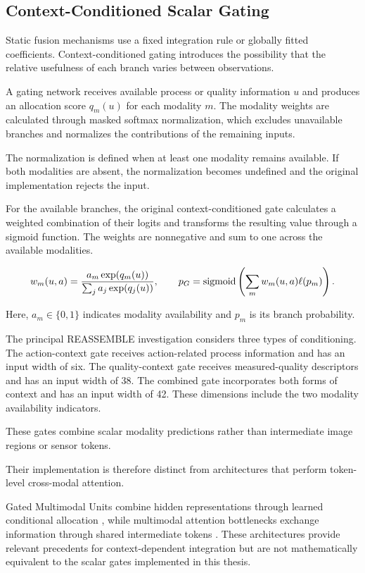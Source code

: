 \subsection{Context-Conditioned Scalar Gating}

Static fusion mechanisms use a fixed integration rule or globally fitted coefficients. Context-conditioned gating introduces the possibility that the relative usefulness of each branch varies between observations.

A gating network receives available process or quality information \(u\) and produces an allocation score \(q_m(u)\) for each modality \(m\). The modality weights are calculated through masked softmax normalization, which excludes unavailable branches and normalizes the contributions of the remaining inputs.

The normalization is defined when at least one modality remains available. If both modalities are absent, the normalization becomes undefined and the original implementation rejects the input.

For the available branches, the original context-conditioned gate calculates a weighted combination of their logits and transforms the resulting value through a sigmoid function. The weights are nonnegative and sum to one across the available modalities.

\begin{equation}
 w_m(u,a)=\frac{a_m\exp(q_m(u))}{\sum_j a_j\exp(q_j(u))},\qquad
 p_G=\operatorname{sigmoid}\left(\sum_m w_m(u,a)\ell(p_m)\right).
 \label{eq:gate}
\end{equation}

Here, \(a_m\in\{0,1\}\) indicates modality availability and \(p_m\) is its branch probability.

The principal REASSEMBLE investigation considers three types of conditioning. The action-context gate receives action-related process information and has an input width of six. The quality-context gate receives measured-quality descriptors and has an input width of 38. The combined gate incorporates both forms of context and has an input width of 42. These dimensions include the two modality availability indicators.

These gates combine scalar modality predictions rather than intermediate image regions or sensor tokens.

Their implementation is therefore distinct from architectures that perform token-level cross-modal attention.

Gated Multimodal Units combine hidden representations through learned conditional allocation \parencite{P006}, while multimodal attention bottlenecks exchange information through shared intermediate tokens \parencite{Nagrani2021MBT}. These architectures provide relevant precedents for context-dependent integration but are not mathematically equivalent to the scalar gates implemented in this thesis.

